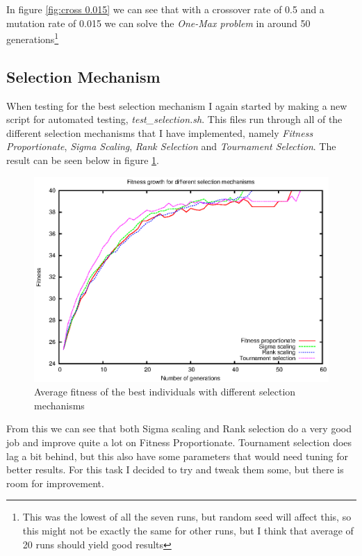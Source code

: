 In figure \ref{fig:cross 0.015} we can see that with a crossover rate of 0.5 and
a mutation rate of 0.015 we can solve the \textit{One-Max problem} in around 50
generations\footnote{This was the lowest of all the seven runs, but random seed
	will affect this, so this might not be exactly the same for other
runs, but I think that average of 20 runs should yield good results}

\subsection{Selection Mechanism}\label{sec:selection mechanism}
When testing for the best selection mechanism I again started by making a new
script for automated testing, \textit{test\_selection.sh}. This files run
through all of the different selection mechanisms that I have implemented,
namely \textit{Fitness Proportionate}, \textit{Sigma Scaling}, \textit{Rank
Selection} and \textit{Tournament Selection}. The result can be seen below in
figure \ref{fig:selection}.

\begin{figure}[h!]
	\includegraphics{../graphs/fitness_selection_average.eps}
	\caption{Average fitness of the best individuals with different
	selection mechanisms}
	\label{fig:selection}
\end{figure}

From this we can see that both Sigma scaling and Rank selection do a very good
job and
improve quite a lot on Fitness Proportionate. Tournament selection does lag a
bit behind, but this also have some parameters that would need tuning for better
results. For this task I decided to try and tweak them some, but there is room for improvement.

